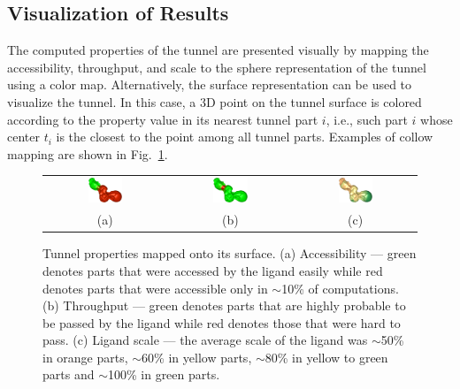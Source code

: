 \documentclass{svmult}
\newcommand{\tylde}{$\sim$}
\begin{document}
\subsection{Visualization of Results}

The computed properties of the tunnel are presented visually by mapping the accessibility, throughput, and scale to the sphere representation
of the tunnel using a color map.
Alternatively, the surface representation can be used to visualize the tunnel.
In this case, a 3D point on the tunnel surface is colored according to the property value in its nearest tunnel part $i$,  i.e., such part $i$ whose center $t_i$ is the closest to the point among all tunnel parts.
Examples of collow mapping are shown in Fig.~\ref{fig:properties}.

\begin{figure}
\centering
\begin{tabular}{ccc}
\includegraphics[width=0.3\textwidth]{fig/accessibility} &
\includegraphics[width=0.3\textwidth]{fig/throughput} &
\includegraphics[width=0.3\textwidth]{fig/ligand-scale} \\
  (a) & (b) & (c) \\                     
\end{tabular}
\caption{Tunnel properties mapped onto its surface.
(a) Accessibility --- green denotes parts that were accessed by the ligand easily while red denotes parts that were accessible only in \tylde 10\% of computations.
(b) Throughput --- green denotes parts that are highly probable to be passed by the ligand while red denotes those that were hard to pass.
(c) Ligand scale --- the average scale of the ligand was \tylde 50\% in orange parts, \tylde 60\% in yellow parts, \tylde 80\% in yellow to green parts and \tylde 100\% in green parts.
\label{fig:properties}
}
\end{figure}
\end{document}
